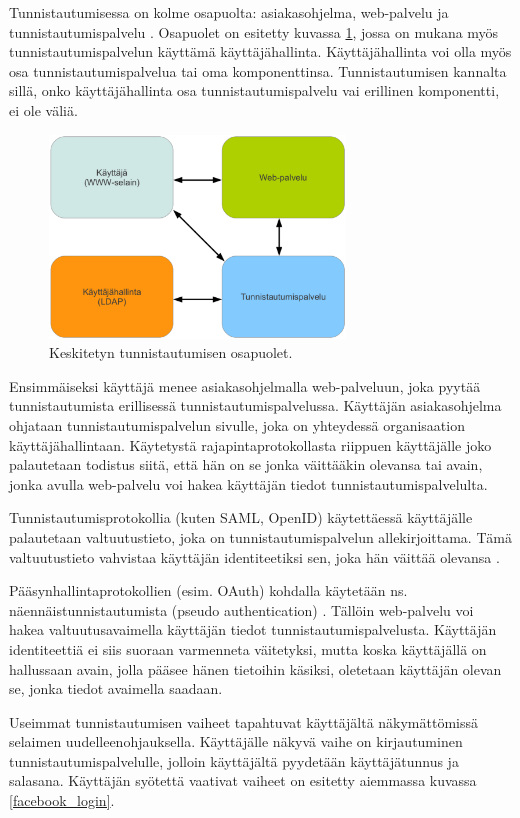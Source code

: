 Tunnistautumisessa on kolme osapuolta: asiakasohjelma, web-palvelu ja tunnistautumispalvelu \cite{nisti}. Osapuolet on esitetty kuvassa \ref{composition}, jossa on mukana myös tunnistautumispalvelun käyttämä käyttäjähallinta. Käyttäjähallinta voi olla myös osa tunnistautumispalvelua tai oma komponenttinsa. Tunnistautumisen kannalta sillä, onko käyttäjähallinta osa tunnistautumispalvelu vai erillinen komponentti, ei ole väliä.

\begin{figure}[ht]
\centering
\includegraphics[width=0.7\textwidth]{teknologiat/composition.eps}
\caption{Keskitetyn tunnistautumisen osapuolet.}%
\label{composition}
\end{figure}

Ensimmäiseksi käyttäjä menee asiakasohjelmalla web-palveluun, joka pyytää tunnistautumista erillisessä tunnistautumispalvelussa. Käyttäjän asiakasohjelma ohjataan tunnistautumispalvelun sivulle, joka on yhteydessä organisaation käyttäjähallintaan. Käytetystä rajapintaprotokollasta riippuen käyttäjälle joko palautetaan todistus siitä, että hän on se jonka väittääkin olevansa tai avain, jonka avulla web-palvelu voi hakea käyttäjän tiedot tunnistautumispalvelulta.

Tunnistautumisprotokollia (kuten SAML, OpenID) käytettäessä käyttäjälle palautetaan valtuutustieto, joka on tunnistautumispalvelun allekirjoittama. Tämä valtuutustieto vahvistaa käyttäjän identiteetiksi sen, joka hän väittää olevansa \cite{nisti}.

Pääsynhallintaprotokollien (esim. OAuth) kohdalla käytetään ns. näennäistunnistautumista (pseudo authentication) \cite{distributed_web_security}. Tällöin web-palvelu voi hakea valtuutusavaimella käyttäjän tiedot tunnistautumispalvelusta. Käyttäjän identiteettiä ei siis suoraan varmenneta väitetyksi, mutta koska käyttäjällä on hallussaan avain, jolla pääsee hänen tietoihin käsiksi, oletetaan käyttäjän olevan se, jonka tiedot avaimella saadaan.

Useimmat tunnistautumisen vaiheet tapahtuvat käyttäjältä näkymättömissä selaimen uudelleenohjauksella. Käyttäjälle näkyvä vaihe on kirjautuminen tunnistautumispalvelulle, jolloin käyttäjältä pyydetään käyttäjätunnus ja salasana. Käyttäjän syötettä vaativat vaiheet on esitetty aiemmassa kuvassa \ref{facebook_login}.